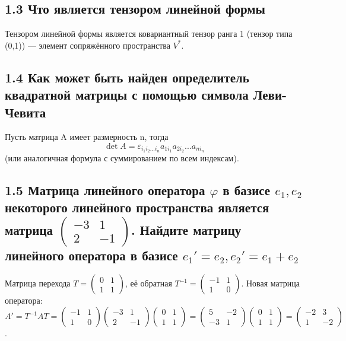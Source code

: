 \documentclass{article}
\begin{document}
\subsection*{1.3 Что является тензором линейной формы}
Тензором линейной формы является ковариантный тензор ранга 1 (тензор типа (0,1)) — элемент сопряжённого пространства \( V^* \).

\subsection*{1.4 Как может быть найден определитель квадратной матрицы с помощью символа Леви-Чевита}
Пусть матрица A имеет размерность n, тогда
\[\det A = \varepsilon_{i_1 i_2 ... i_n} a_{1 i_1} a_{2 i_2} ... a_{n i_n}\]
(или аналогичная формула с суммированием по всем индексам).

\subsection*{1.5 Матрица линейного оператора \( \varphi \) в базисе \( e_1, e_2 \) некоторого линейного пространства является матрица \( \begin{pmatrix} -3 & 1 \\ 2 & -1 \end{pmatrix} \). Найдите матрицу линейного оператора в базисе \( e_1' = e_2, e_2' = e_1 + e_2 \)}
Матрица перехода \( T = \begin{pmatrix} 0 & 1 \\ 1 & 1 \end{pmatrix} \), её обратная \( T^{-1} = \begin{pmatrix} -1 & 1 \\ 1 & 0 \end{pmatrix} \).
Новая матрица оператора: \( A' = T^{-1} A T = \begin{pmatrix} -1 & 1 \\ 1 & 0 \end{pmatrix} \begin{pmatrix} -3 & 1 \\ 2 & -1 \end{pmatrix} \begin{pmatrix} 0 & 1 \\ 1 & 1 \end{pmatrix} = \begin{pmatrix} 5 & -2 \\ -3 & 1 \end{pmatrix} \begin{pmatrix} 0 & 1 \\ 1 & 1 \end{pmatrix} = \begin{pmatrix} -2 & 3 \\ 1 & -2 \end{pmatrix} \).
\end{document}
